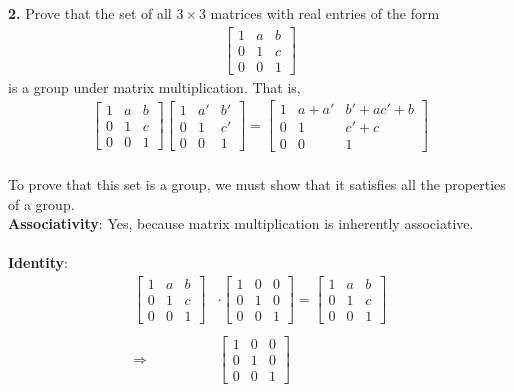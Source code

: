 \documentclass[12pt, letterpaper]{article}
\begin{document}
\vspace{0.2em}
\textbf{2.} Prove that the set of all $3 \times 3$ matrices with real entries of the form
\begin{align*}
    \left[\begin{array}{ccc}
         1& a & b\\
         0& 1& c \\
         0 & 0 & 1
    \end{array}\right]
\end{align*}
is a group under matrix multiplication. That is,
\begin{align*}
    \left[\begin{array}{ccc}
         1& a & b \\
         0& 1& c\\
         0 & 0 & 1
    \end{array}\right] \left[\begin{array}{ccc}
         1& a'& b' \\
         0& 1 & c' \\
         0 & 0 & 1
    \end{array}\right] = \left[\begin{array}{ccc}
         1 & a + a' & b' + ac' + b \\
         0 & 1 & c' + c \\
         0 & 0 & 1
    \end{array}\right]
\end{align*} \\
To prove that this set is a group, we must show that it satisfies all the properties of a group.\\
\indent \textbf{Associativity}: Yes, because matrix multiplication is inherently associative. \\ \\ 
\indent \textbf{Identity}: \begin{align*}
    \left[\begin{array}{ccc}
         1& a & b\\
         0& 1& c \\
         0 & 0 & 1
    \end{array}\right] &\cdot \left[\begin{array}{ccc}
         1& 0 & 0 \\
         0& 1 & 0 \\
         0 & 0 & 1
    \end{array}\right] = \left[\begin{array}{ccc}
         1& a & b \\
         0& 1 & c \\
         0 & 0 & 1
    \end{array} \right] \\ \\
    \Rightarrow \ &\boxed{\left[\begin{array}{ccc}
         1& 0 & 0 \\
         0& 1 & 0 \\
         0 & 0 & 1
    \end{array}\right]}
\end{align*}
\end{document}
